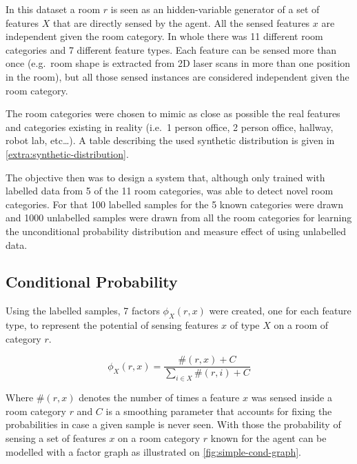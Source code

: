 In this dataset a room $r$ is seen as an hidden-variable generator of a set of
features $X$ that are directly sensed by the agent.
All the sensed features $x$ are independent given the room category.
In whole there was 11 different room categories and 7 different feature types.
Each feature can be sensed more than once (e.g.\ room shape is extracted from 2D
laser scans in more than one position in the room), but all those sensed
instances are considered independent given the room category.

The room categories were chosen to mimic as close as possible the real features
and categories existing in reality (i.e.\ 1 person office, 2 person office,
hallway, robot lab, etc\dots). A table describing the used synthetic
distribution is given in \autoref{extra:synthetic-distribution}.

The objective then was to design a system that, although only trained with
labelled data from 5 of the 11 room categories, was able to detect novel
room categories.
For that 100 labelled samples for the 5 known categories were drawn and 1000 
unlabelled samples were drawn from all the room categories for learning the
unconditional probability distribution and measure effect of using unlabelled
data.

\subsection{Conditional Probability}
Using the labelled samples, 7 factors $\phi_X(r,x)$ were created, one for each
feature type, to represent the potential of sensing features $x$ of type $X$ on
a room of category $r$.

\begin{equation}
\phi_X(r,x) = \frac{\#(r,x)+C}{\sum_{i \in X}{\#(r,i)+C}}
\end{equation}

Where $\#(r,x)$ denotes the number of times a feature $x$ was sensed inside a
room category $r$ and $C$ is a smoothing parameter that accounts for fixing
the probabilities in case a given sample is never seen.
With those the probability of sensing a set of features $x$ on a room category
$r$ known for the agent can be modelled with a factor graph as illustrated on
\autoref{fig:simple-cond-graph}.

